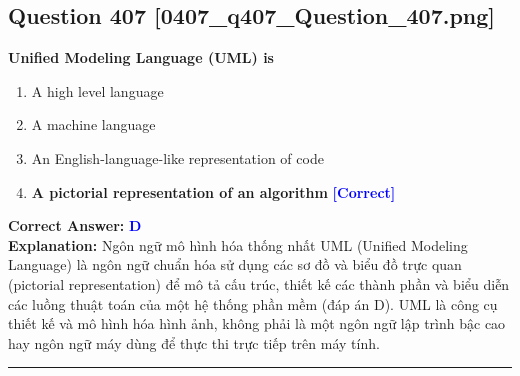 \documentclass[11pt,a4paper]{article}
\begin{document}
\begin{minipage}{\textwidth}
\subsection*{Question 407 \quad \footnotesize{[0407\_q407\_Question\_407.png]}}
\noindent \textbf{Unified Modeling Language (UML) is}

\begin{enumerate}[label=\Alph*.]
    \item A high level language
    \item A machine language
    \item An English-language-like representation of code
    \item \textbf{A pictorial representation of an algorithm} \hfill \textcolor{blue}{\textbf{[Correct]}}
\end{enumerate}

\noindent \textbf{Correct Answer:} \textcolor{blue}{\textbf{D}} \\[2pt]
\noindent \textbf{Explanation:} Ngôn ngữ mô hình hóa thống nhất UML (Unified Modeling Language) là ngôn ngữ chuẩn hóa sử dụng các sơ đồ và biểu đồ trực quan (pictorial representation) để mô tả cấu trúc, thiết kế các thành phần và biểu diễn các luồng thuật toán của một hệ thống phần mềm (đáp án D). UML là công cụ thiết kế và mô hình hóa hình ảnh, không phải là một ngôn ngữ lập trình bậc cao hay ngôn ngữ máy dùng để thực thi trực tiếp trên máy tính.

\par\vspace{0.3cm}
\hrule
\vspace{0.3cm}
\end{minipage}
\end{document}
